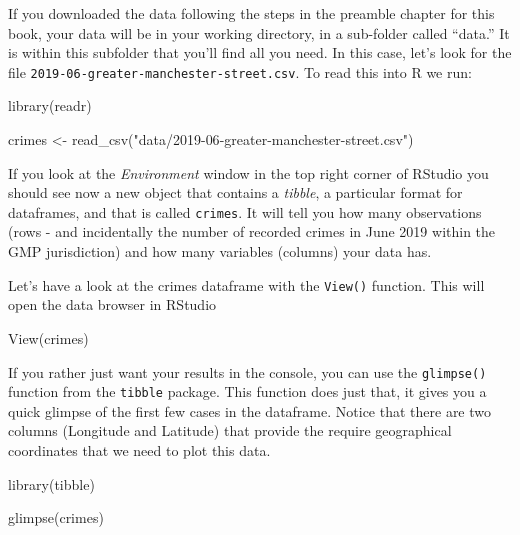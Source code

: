 \documentclass[
]{book}
\newenvironment{Shaded}{\begin{snugshade}}{\end{snugshade}}
\newcommand{\FunctionTok}[1]{\textcolor[rgb]{0.00,0.00,0.00}{#1}}
\newcommand{\NormalTok}[1]{#1}
\newcommand{\OtherTok}[1]{\textcolor[rgb]{0.56,0.35,0.01}{#1}}
\newcommand{\StringTok}[1]{\textcolor[rgb]{0.31,0.60,0.02}{#1}}
\begin{document}
If you downloaded the data following the steps in the preamble chapter for this book, your data will be in your working directory, in a sub-folder called ``data.'' It is within this subfolder that you'll find all you need. In this case, let's look for the file \texttt{2019-06-greater-manchester-street.csv}. To read this into R we run:

\begin{Shaded}
\begin{Highlighting}[]
\FunctionTok{library}\NormalTok{(readr)}

\NormalTok{crimes }\OtherTok{\textless{}{-}} \FunctionTok{read\_csv}\NormalTok{(}\StringTok{"data/2019{-}06{-}greater{-}manchester{-}street.csv"}\NormalTok{)}
\end{Highlighting}
\end{Shaded}

If you look at the \emph{Environment} window in the top right corner of RStudio you should see now a new object that contains a \emph{tibble}, a particular format for dataframes, and that is called \texttt{crimes}. It will tell you how many observations (rows - and incidentally the number of recorded crimes in June 2019 within the GMP jurisdiction) and how many variables (columns) your data has.

Let's have a look at the crimes dataframe with the \texttt{View()} function. This will open the data browser in RStudio

\begin{Shaded}
\begin{Highlighting}[]
\FunctionTok{View}\NormalTok{(crimes)}
\end{Highlighting}
\end{Shaded}

If you rather just want your results in the console, you can use the \texttt{glimpse()} function from the \texttt{tibble} package. This function does just that, it gives you a quick glimpse of the first few cases in the dataframe. Notice that there are two columns (Longitude and Latitude) that provide the require geographical coordinates that we need to plot this data.

\begin{Shaded}
\begin{Highlighting}[]
\FunctionTok{library}\NormalTok{(tibble)}

\FunctionTok{glimpse}\NormalTok{(crimes)}
\end{Highlighting}
\end{Shaded}
\end{document}
